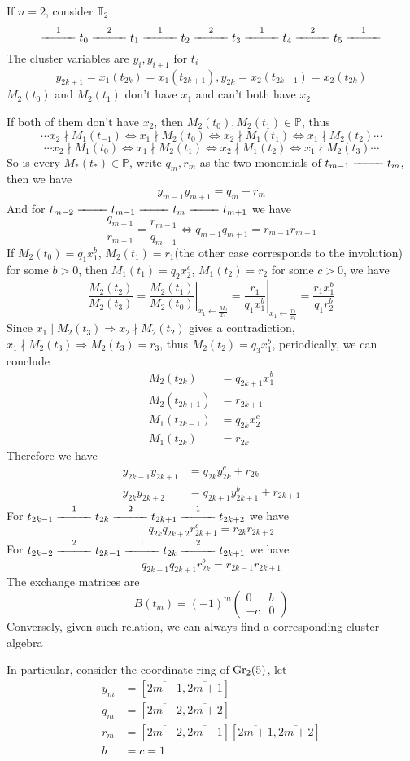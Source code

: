 \documentclass[main]{subfiles}
\begin{document}
\begin{example}\label{Cluster algebra of rank 2}
If $n=2$, consider $\mathbb T_2$
\[\xedge 1t_0\xedge 2t_1\xedge 1t_2\xedge 2t_3\xedge 1t_4\xedge 2t_5\xedge 1\]
The cluster variables are $y_i,y_{i+1}$ for $t_i$
\[y_{2k+1}=x_1(t_{2k})=x_1(t_{2k+1}),y_{2k}=x_2(t_{2k-1})=x_2(t_{2k})\]
$M_2(t_0)$ and $M_2(t_1)$ don't have $x_1$ and can't both have $x_2$ \par
If both of them don't have $x_2$, then $M_2(t_0),M_2(t_1)\in\mathbb P$, thus
\[\cdots x_2\nmid M_1(t_{-1})\Leftrightarrow x_1\nmid M_2(t_0)\Leftrightarrow x_2\nmid M_1(t_1)\Leftrightarrow x_1\nmid M_2(t_2)\cdots \]
\[\cdots x_2\nmid M_1(t_0)\Leftrightarrow x_1\nmid M_2(t_1)\Leftrightarrow x_2\nmid M_1(t_2)\Leftrightarrow x_1\nmid M_2(t_3)\cdots \]
So is every $M_*(t_*)\in\mathbb P$, write $q_m,r_m$ as the two monomials of $t_{m-1}\xedge{\medskip}t_m$, then we have
\[y_{m-1}y_{m+1}=q_m+r_m\]
And for $t_{m-2}\xedge{\medskip} t_{m-1}\xedge{\medskip}t_m\xedge{\medskip}t_{m+1}$ we have
\[\dfrac{q_{m+1}}{r_{m+1}}=\frac{r_{m-1}}{q_{m-1}}\Leftrightarrow q_{m-1}q_{m+1}=r_{m-1}r_{m+1}\]
If $M_2(t_0)=q_1x_1^b$, $M_2(t_1)=r_1$(the other case corresponds to the involution) for some $b>0$, then $M_1(t_1)=q_2x_2^c$, $M_1(t_2)=r_2$ for some $c>0$, we have
\[\frac{M_2(t_2)}{M_2(t_3)}=\left.\frac{M_2(t_1)}{M_2(t_0)}\right|_{x_1\leftarrow\frac{M_0}{x_1}}=\left.\frac{r_1}{q_1x_1^b}\right|_{x_1\leftarrow\frac{r_2}{x_1}}=\frac{r_1x_1^b}{q_1r_2^b}\]
Since $x_1\mid M_2(t_3)\Rightarrow x_2\nmid M_2(t_2)$ gives a contradiction, $x_1\nmid M_2(t_3)\Rightarrow M_2(t_3)=r_3$, thus $M_2(t_2)=q_3x_1^b$, periodically, we can conclude
\begin{align*}
M_2(t_{2k})&=q_{2k+1}x_1^b \\
M_2(t_{2k+1})&=r_{2k+1} \\
M_1(t_{2k-1})&=q_{2k}x_2^c \\
M_1(t_{2k})&=r_{2k}
\end{align*}
Therefore we have
\begin{align*}
y_{2k-1}y_{2k+1}&=q_{2k}y_{2k}^c+r_{2k} \\
y_{2k}y_{2k+2}&=q_{2k+1}y_{2k+1}^b+r_{2k+1}
\end{align*}
For $t_{2k-1}\xedge{1}t_{2k}\xedge{2}t_{2k+1}\xedge{1}t_{2k+2}$ we have
\[q_{2k}q_{2k+2}r_{2k+1}^c=r_{2k}r_{2k+2}\]
For $t_{2k-2}\xedge{2}t_{2k-1}\xedge{1}t_{2k}\xedge{2}t_{2k+1}$ we have
\[q_{2k-1}q_{2k+1}r_{2k}^b=r_{2k-1}r_{2k+1}\]
The exchange matrices are
\[B(t_m)=(-1)^m\begin{pmatrix}
0&b \\
-c&0
\end{pmatrix}\]
Conversely, given such relation, we can always find a corresponding cluster algebra \par
In particular, consider the coordinate ring of $\operatorname{Gr}_2(5)$, let
\begin{align*}
y_m&=[\overline{2m-1},\overline{2m+1}] \\
q_m&=[\overline{2m-2},\overline{2m+2}] \\
r_m&=[\overline{2m-2},\overline{2m-1}][\overline{2m+1},\overline{2m+2}] \\
b&=c=1
\end{align*}
\end{example}
\end{document}
